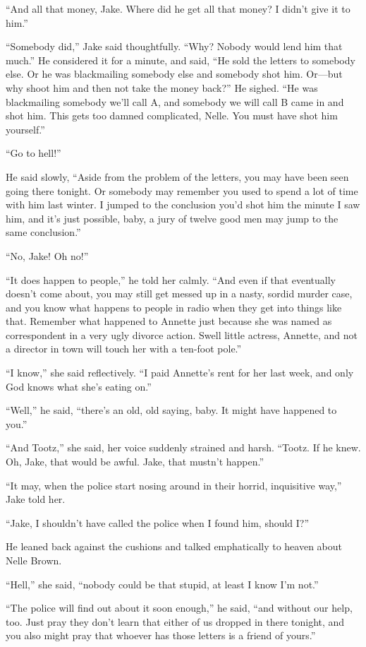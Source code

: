 \documentclass{novel}
\begin{document}
“And all that money, Jake. Where did he get all that money? I didn’t give it to him.”

“Somebody did,” Jake said thoughtfully. “Why? Nobody would lend him that much.” He considered it for a minute, and said, “He sold the letters to somebody else. Or he was blackmailing somebody else and somebody shot him. Or—but why shoot him and then not take the money back?” He sighed. “He was blackmailing somebody we’ll call A, and somebody we will call B came in and shot him. This gets too damned complicated, Nelle. You must have shot him yourself.”

“Go to hell!”

He said slowly, “Aside from the problem of the letters, you may have been seen going there tonight. Or somebody may remember you used to spend a lot of time with him last winter. I jumped to the conclusion you’d shot him the minute I saw him, and it’s just possible, baby, a jury of twelve good men may jump to the same conclusion.”

“No, Jake! Oh no!”

“It does happen to people,” he told her calmly. “And even if that eventually doesn’t come about, you may still get messed up in a nasty, sordid murder case, and you know what happens to people in radio when they get into things like that. Remember what happened to Annette just because she was named as correspondent in a very ugly divorce action. Swell little actress, Annette, and not a director in town will touch her with a ten-foot pole.”

“I know,” she said reflectively. “I paid Annette’s rent for her last week, and only God knows what she’s eating on.”

“Well,” he said, “there’s an old, old saying, baby. It might have happened to you.”

“And Tootz,” she said, her voice suddenly strained and harsh. “Tootz. If he knew. Oh, Jake, that would be awful. Jake, that mustn’t happen.”

“It may, when the police start nosing around in their horrid, inquisitive way,” Jake told her.

“Jake, I shouldn’t have called the police when I found him, should I?”

He leaned back against the cushions and talked emphatically to heaven about Nelle Brown.

“Hell,” she said, “nobody could be that stupid, at least I know I’m not.”

“The police will find out about it soon enough,” he said, “and without our help, too. Just pray they don’t learn that either of us dropped in there tonight, and you also might pray that whoever has those letters is a friend of yours.”
\end{document}
